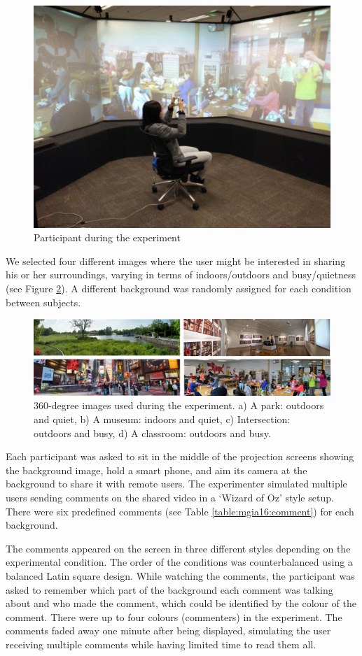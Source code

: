 \begin{figure}[ht]
  \centering
  \includegraphics[width=.6\linewidth]{images/mgia16/participant1}
  \caption{Participant during the experiment}
	\label{fig:mgia16:participant}
\end{figure}

We selected four different images where the user might be interested in sharing his or her surroundings, varying in terms of indoors/outdoors and busy/quietness (see Figure \ref{fig:mgia16:backgrounds}). A different background was randomly assigned for each condition between subjects. 

\begin{figure}[b]
  \centering
  \includegraphics[width=\linewidth]{images/mgia16/backgrounds-legend.png}
  \caption{360-degree images used during the experiment. a) A park: outdoors and quiet, b) A museum: indoors and quiet, c) Intersection: outdoors and busy, d) A classroom: outdoors and busy.}
	\label{fig:mgia16:backgrounds}
\end{figure}

Each participant was asked to sit in the middle of the projection screens showing the background image, hold a smart phone, and aim its camera at the background to share it with remote users. The experimenter simulated multiple users sending comments on the shared video in a ‘Wizard of Oz' style setup. There were six predefined comments (see Table \ref{table:mgia16:comment}) for each background. 

The comments appeared on the screen in three different styles depending on the experimental condition. The order of the conditions was counterbalanced using a balanced Latin square design. While watching the comments, the participant was asked to remember which part of the background each comment was talking about and who made the comment, which could be identified by the colour of the comment. There were up to four colours (commenters) in the experiment. The comments faded away one minute after being displayed, simulating the user receiving multiple comments while having limited time to read them all.

